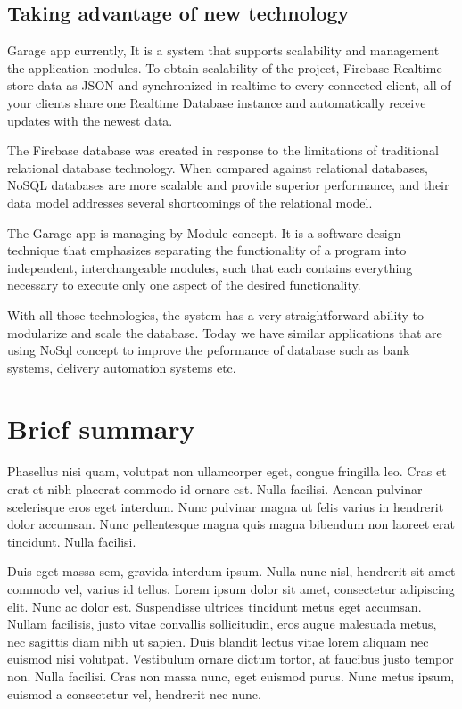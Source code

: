 \subsection{Taking advantage of new technology}

Garage app currently, It is a system that supports scalability and management the application modules. To obtain scalability of the project, Firebase Realtime store data as JSON and synchronized in realtime to every connected client, all of your clients share one Realtime Database instance and automatically receive updates with the newest data.

The Firebase database was created in response to the limitations of traditional relational database technology. When compared against relational databases, NoSQL databases are more scalable and provide superior performance, and their data model addresses several shortcomings of the relational model.

The Garage app is managing by Module concept. It is a software design technique that emphasizes separating the functionality of a program into independent, interchangeable modules, such that each contains everything necessary to execute only one aspect of the desired functionality.

With all those technologies, the system has a very straightforward ability to modularize and scale the database. Today we have similar applications that are using NoSql concept to improve the peformance of database such as bank systems, delivery automation systems etc. 


\section{Brief summary}

Phasellus nisi quam, volutpat non ullamcorper eget, congue fringilla leo. Cras et erat et nibh placerat commodo id ornare est. Nulla facilisi. Aenean pulvinar scelerisque eros eget interdum. Nunc pulvinar magna ut felis varius in hendrerit dolor accumsan. Nunc pellentesque magna quis magna bibendum non laoreet erat tincidunt. Nulla facilisi.

Duis eget massa sem, gravida interdum ipsum. Nulla nunc nisl, hendrerit sit amet commodo vel, varius id tellus. Lorem ipsum dolor sit amet, consectetur adipiscing elit. Nunc ac dolor est. Suspendisse ultrices tincidunt metus eget accumsan. Nullam facilisis, justo vitae convallis sollicitudin, eros augue malesuada metus, nec sagittis diam nibh ut sapien. Duis blandit lectus vitae lorem aliquam nec euismod nisi volutpat. Vestibulum ornare dictum tortor, at faucibus justo tempor non. Nulla facilisi. Cras non massa nunc, eget euismod purus. Nunc metus ipsum, euismod a consectetur vel, hendrerit nec nunc.
